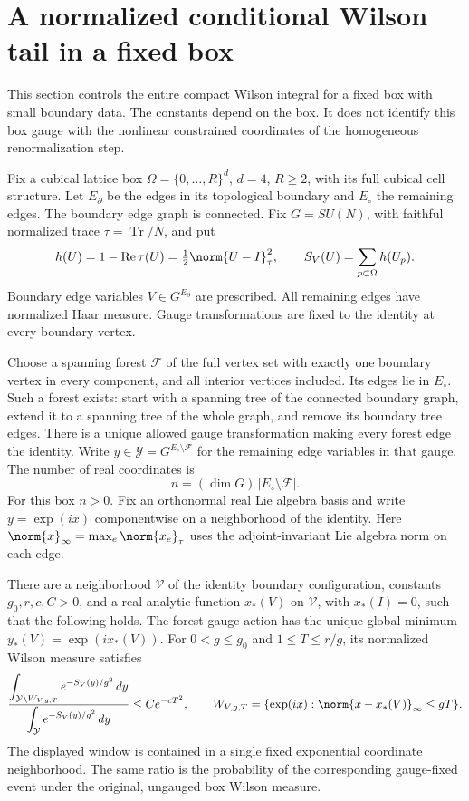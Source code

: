 \section{A normalized conditional Wilson tail in a fixed box}
\label{fbw:section}

This section controls the entire compact Wilson integral for a fixed
box with small boundary data. The constants depend on the box. It
does not identify this box gauge with the nonlinear constrained
coordinates of the homogeneous renormalization step.

Fix a cubical lattice box \(\Omega=\{0,\ldots,R\}^d\), \(d=4\),
\(R\geq2\), with its full cubical cell structure. Let \(E_\partial\)
be the edges in its topological boundary and \(E_\circ\) the remaining
edges. The boundary edge graph is connected. Fix
\(G=SU(N)\), with faithful normalized trace \(\tau=\operatorname{Tr}/N\),
and put
\[
 h(U)=1-\operatorname{Re}\tau(U)
     =\tfrac12\norm{U-I}_\tau^2,\qquad
 S_V(U)=\sum_{p\subset\Omega}h(U_p).
\]
Boundary edge variables \(V\in G^{E_\partial}\) are prescribed.
All remaining edges have normalized Haar measure. Gauge transformations
are fixed to the identity at every boundary vertex.

Choose a spanning forest \(\mathcal F\) of the full vertex set with
exactly one boundary vertex in every component, and all interior
vertices included. Its edges lie in \(E_\circ\). Such a forest exists:
start with a spanning tree of the connected boundary graph, extend
it to a spanning tree of the whole graph, and remove its boundary
tree edges. There is a unique allowed gauge transformation making
every forest edge the identity. Write \(y\in\mathcal Y=G^{E_\circ
\setminus\mathcal F}\) for the remaining edge variables in that gauge.
The number of real coordinates is
\[
 n=(\dim G)\,|E_\circ\setminus\mathcal F|.
\]
For this box \(n>0\). Fix an orthonormal real Lie algebra basis and
write \(y=\exp(ix)\) componentwise on a neighborhood of the identity.
Here \(\norm{x}_\infty=\max_e\norm{x_e}_\tau\) uses the
adjoint-invariant Lie algebra norm on each edge.

\begin{theorem}
\label{fbw:theorem}
There are a neighborhood \(\mathcal V\) of the identity boundary
configuration, constants \(g_0,r,c,C>0\), and a real analytic
function \(x_*(V)\) on \(\mathcal V\), with \(x_*(I)=0\), such that
the following holds. The forest-gauge action has the unique global
minimum \(y_*(V)=\exp(ix_*(V))\). For
\(0<g\leq g_0\) and \(1\leq T\leq r/g\), its normalized Wilson
measure satisfies
\begin{equation}
 \frac{\displaystyle
    \int_{\mathcal Y\setminus W_{V,g,T}}
           e^{-S_V(y)/g^2}\,dy}
      {\displaystyle\int_{\mathcal Y}e^{-S_V(y)/g^2}\,dy}
 \leq C e^{-cT^2},
 \qquad
 W_{V,g,T}=\{\exp(ix):\norm{x-x_*(V)}_\infty\leq gT\}.
 \label{fbw:tail}
\end{equation}
The displayed window is contained in a single fixed exponential
coordinate neighborhood. The same ratio is the probability of the
corresponding gauge-fixed event under the original, ungauged box
Wilson measure.
\end{theorem}

